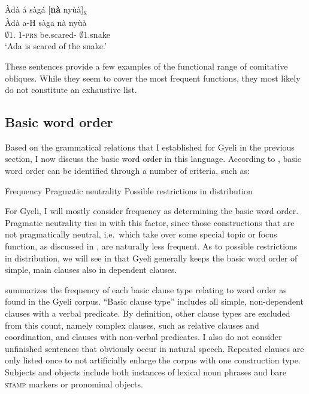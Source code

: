 \ea \label{SOU5}
  \glll Àdà á sàgá [{\bfseries nà} nyùà]\textsubscript{\textsc{x}}  \\
        Àdà a-H sàga {\db}nà nyùà  \\
        $\emptyset$1.{\PN} 1-\textsc{prs} be.scared-{\R} {\db}{\COM} $\emptyset$1.snake\\
    \trans `Ada is scared of the snake.'
\z

\noindent These sentences provide a few examples of the functional range of comitative obliques. While they seem to cover the most frequent functions, they most likely do not constitute an exhaustive list.






\subsection{Basic word order}
\label{sec:BasicCT}

Based on the grammatical relations that I established for Gyeli in the previous section, I now discuss the  basic word order in this language. %
According to \citet[73--76]{dryer2007b}, basic word order can be identified through a number of criteria, such as:

\begin{enumerate}
\itshapeem Frequency
\itshapeem Pragmatic neutrality
\itshapeem Possible restrictions in distribution
\end{enumerate}
For Gyeli, I will mostly consider frequency as determining the basic word order. Pragmatic neutrality ties in with this factor, since those constructions that are not pragmatically neutral, i.e.\ which take over some special topic or focus function, as discussed in , are naturally less frequent. As to possible restrictions in distribution, we will see in  that Gyeli generally keeps the basic word order of simple, main clauses also in dependent clauses.


 summarizes the frequency of each basic clause type relating to word order as found in the Gyeli corpus. ``Basic clause type'' includes all simple, non-dependent clauses with a verbal predicate.
By definition, other clause types are excluded from this count, namely complex clauses, such as relative clauses and coordination,  and clauses with non-verbal predicates. I also do not consider unfinished sentences that obviously occur in natural speech. Repeated clauses are only listed once to not artificially enlarge the corpus with one construction type. Subjects and objects include both instances of lexical noun phrases and bare \textsc{stamp} markers or pronominal objects.


